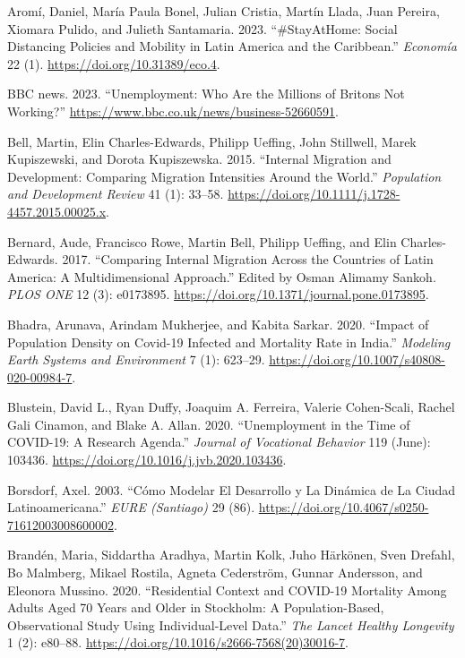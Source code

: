 \documentclass[11pt,letterpaper]{article}
\newlength{\cslhangindent}
\newlength{\cslentryspacingunit} %
\newenvironment{CSLReferences}[2] %
 {%
  \setlength{\parindent}{0pt}
  \ifodd #1
  \let\oldpar\par
  \def\par{\hangindent=\cslhangindent\oldpar}
  \fi
  \setlength{\parskip}{#2\cslentryspacingunit}
 }%
 {}
\begin{document}
\hypertarget{refs}{}
\begin{CSLReferences}{1}{0}
\leavevmode{}%
Aromí, Daniel, María Paula Bonel, Julian Cristia, Martín Llada, Juan
Pereira, Xiomara Pulido, and Julieth Santamaria. 2023. {``\#StayAtHome:
Social Distancing Policies and Mobility in Latin America and the
Caribbean.''} \emph{Economía} 22 (1).
\url{https://doi.org/10.31389/eco.4}.

\leavevmode{}%
BBC news. 2023. {``Unemployment: Who Are the Millions of Britons Not
Working?''} \url{https://www.bbc.co.uk/news/business-52660591}.

\leavevmode{}%
Bell, Martin, Elin Charles-Edwards, Philipp Ueffing, John Stillwell,
Marek Kupiszewski, and Dorota Kupiszewska. 2015. {``Internal Migration
and Development: Comparing Migration Intensities Around the World.''}
\emph{Population and Development Review} 41 (1): 33--58.
\url{https://doi.org/10.1111/j.1728-4457.2015.00025.x}.

\leavevmode{}%
Bernard, Aude, Francisco Rowe, Martin Bell, Philipp Ueffing, and Elin
Charles-Edwards. 2017. {``Comparing Internal Migration Across the
Countries of Latin America: A Multidimensional Approach.''} Edited by
Osman Alimamy Sankoh. \emph{PLOS ONE} 12 (3): e0173895.
\url{https://doi.org/10.1371/journal.pone.0173895}.

\leavevmode{}%
Bhadra, Arunava, Arindam Mukherjee, and Kabita Sarkar. 2020. {``Impact
of Population Density on Covid-19 Infected and Mortality Rate in
India.''} \emph{Modeling Earth Systems and Environment} 7 (1): 623--29.
\url{https://doi.org/10.1007/s40808-020-00984-7}.

\leavevmode{}%
Blustein, David L., Ryan Duffy, Joaquim A. Ferreira, Valerie
Cohen-Scali, Rachel Gali Cinamon, and Blake A. Allan. 2020.
{``Unemployment in the Time of COVID-19: A Research Agenda.''}
\emph{Journal of Vocational Behavior} 119 (June): 103436.
\url{https://doi.org/10.1016/j.jvb.2020.103436}.

\leavevmode{}%
Borsdorf, Axel. 2003. {``Cómo Modelar El Desarrollo y La Dinámica de La
Ciudad Latinoamericana.''} \emph{EURE (Santiago)} 29 (86).
\url{https://doi.org/10.4067/s0250-71612003008600002}.

\leavevmode{}%
Brandén, Maria, Siddartha Aradhya, Martin Kolk, Juho Härkönen, Sven
Drefahl, Bo Malmberg, Mikael Rostila, Agneta Cederström, Gunnar
Andersson, and Eleonora Mussino. 2020. {``Residential Context and
COVID-19 Mortality Among Adults Aged 70 Years and Older in Stockholm: A
Population-Based, Observational Study Using Individual-Level Data.''}
\emph{The Lancet Healthy Longevity} 1 (2): e80--88.
\url{https://doi.org/10.1016/s2666-7568(20)30016-7}.


\end{CSLReferences}
\end{document}
